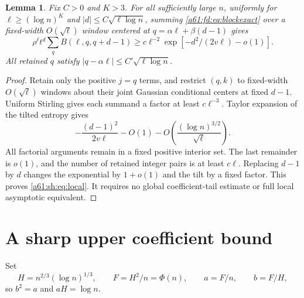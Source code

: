 \documentclass[11pt,letterpaper]{article}
\numberwithin{equation}{section}
\newtheorem{lemma}[theorem]{Lemma}
\theoremstyle{remark}\newtheorem{remark}[theorem]{Remark}
\begin{document}
\begin{lemma}\label{a61:sh:lem:local}
Fix $C>0$ and $K>3$. For all sufficiently large $n$, uniformly for $\ell\ge(\log n)^K$ and $|d|\le C\sqrt{\ell\log n}$, summing \eqref{a61:fd:eq:blockexact} over a fixed-width $O(\sqrt\ell)$ window centered at
$q=\alpha\ell+\beta(d-1)$ gives
\begin{equation}\label{a61:sh:eq:local}
 \rho^\ell t^d\sum_q B(\ell,q,q+d-1)
 \ge c\ell^{-2}\exp[-d^2/(2v\ell)-o(1)].
\end{equation}
All retained $q$ satisfy $|q-\alpha\ell|\le C'\sqrt{\ell\log n}$.
\end{lemma}
\begin{proof}
Retain only the positive $j=q$ terms, and restrict $(q,k)$ to fixed-width $O(\sqrt\ell)$ windows about their joint Gaussian conditional centers at fixed $d-1$. Uniform Stirling gives each summand a factor at least $c\ell^{-3}$. Taylor expansion of the tilted entropy gives
\[
 -\frac{(d-1)^2}{2v\ell}-O(1)
 -O\left(\frac{(\log n)^{3/2}}{\sqrt\ell}\right).
\]
All factorial arguments remain in a fixed positive interior set. The last remainder is $o(1)$, and the number of retained integer pairs is at least $c\ell$. Replacing $d-1$ by $d$ changes the exponential by $1+o(1)$ and the tilt by a fixed factor. This proves \eqref{a61:sh:eq:local}. It requires no global coefficient-tail estimate or full local asymptotic equivalent.
\end{proof}

\section{A sharp upper coefficient bound}
Set
\[
 H=n^{2/3}(\log n)^{1/3},\qquad F=H^2/n=\Phi(n),\qquad
 a=F/n,\qquad b=F/H,
\]
so $b^2=a$ and $aH=\log n$.
\end{document}

